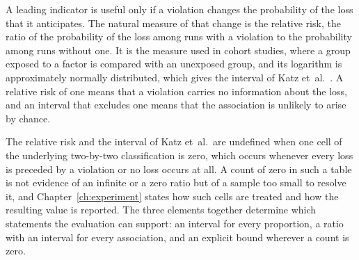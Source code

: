 A leading indicator is useful only if a violation changes the probability of the loss
that it anticipates. The natural measure of that change is the relative risk, the
ratio of the probability of the loss among runs with a violation to the probability
among runs without one. It is the measure used in cohort studies, where a group
exposed to a factor is compared with an unexposed group, and its logarithm is
approximately normally distributed, which gives the interval of Katz et~al.\
\cite{katz1978risk}. A relative risk of one means that a violation carries no
information about the loss, and an interval that excludes one means that the
association is unlikely to arise by chance.

The relative risk and the interval of Katz et~al.\ are undefined when one cell of the
underlying two-by-two classification is zero, which occurs whenever every loss is
preceded by a violation or no loss occurs at all. A count of zero in such a table is
not evidence of an infinite or a zero ratio but of a sample too small to resolve it,
and Chapter~\ref{ch:experiment} states how such cells are treated and how the
resulting value is reported. The three elements together determine which statements
the evaluation can support: an interval for every proportion, a ratio with an interval
for every association, and an explicit bound wherever a count is zero.
